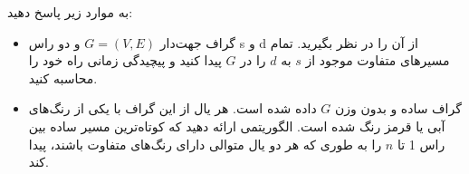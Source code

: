 به موارد زیر پاسخ دهید:
\begin{itemize}
\item
گراف جهت‌دار $G = (V, E)$ و دو راس s و d از آن را در نظر بگیرید. تمام مسیرهای متفاوت موجود از $s$ به $d$ را در $G$ پیدا کنید و پیچیدگی زمانی راه خود را محاسبه کنید.
\item
گراف ساده و بدون وزن $G$ داده شده است. هر یال از این گراف با یکی از رنگ‌های آبی یا قرمز رنگ شده است. الگوریتمی ارائه دهید که کوتاه‌ترین مسیر ساده بین راس 1 تا $n$ را به طوری که هر دو یال متوالی دارای رنگ‌های متفاوت باشند، پیدا کند.
\end{itemize}